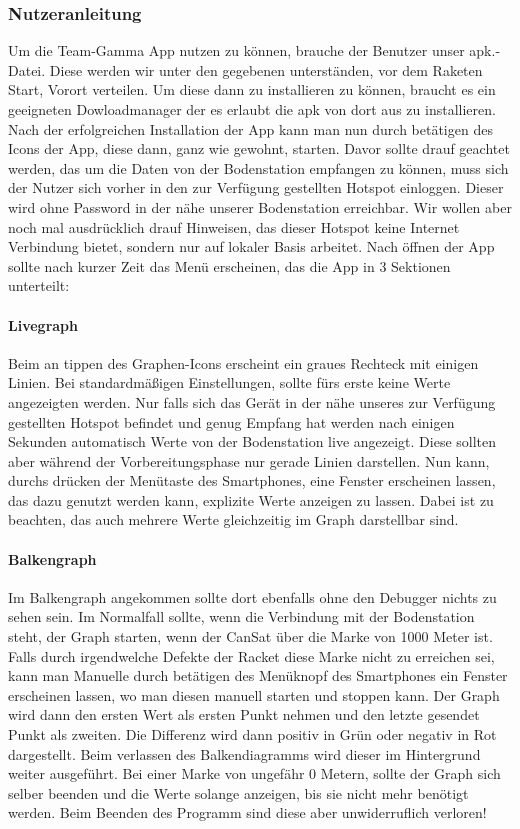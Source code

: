 \subsubsection{Nutzeranleitung}
Um die Team-Gamma App nutzen zu können, brauche der Benutzer unser apk.-Datei. Diese werden wir unter den gegebenen unterständen, vor dem Raketen Start, Vorort verteilen. Um diese dann zu installieren zu können, braucht es ein geeigneten Dowloadmanager der es erlaubt die apk von dort aus zu installieren. Nach der erfolgreichen Installation der App kann man nun durch betätigen des Icons der App, diese dann, ganz wie gewohnt, starten. Davor sollte drauf geachtet werden, das um die Daten von der Bodenstation empfangen zu können, muss sich der Nutzer sich vorher in den zur Verfügung gestellten Hotspot einloggen. Dieser wird ohne Password in der nähe unserer Bodenstation erreichbar. Wir wollen aber noch mal ausdrücklich drauf Hinweisen, das dieser Hotspot keine Internet Verbindung bietet, sondern nur auf lokaler Basis arbeitet.
Nach öffnen der App sollte nach kurzer Zeit das Menü erscheinen, das die App in 3 Sektionen unterteilt: 

	\paragraph{Livegraph}
	Beim an tippen des Graphen-Icons erscheint ein graues Rechteck mit einigen Linien. Bei standardmäßigen Einstellungen, sollte fürs erste keine Werte angezeigten werden. Nur falls sich das Gerät in der nähe unseres zur Verfügung gestellten Hotspot befindet und genug Empfang hat werden nach einigen Sekunden automatisch Werte von der Bodenstation live angezeigt. Diese sollten aber während der Vorbereitungsphase nur gerade Linien darstellen. Nun kann, durchs  drücken der Menütaste des Smartphones, eine Fenster erscheinen lassen, das dazu genutzt werden kann, explizite Werte anzeigen zu lassen. Dabei ist zu beachten, das auch mehrere Werte gleichzeitig im Graph darstellbar sind.
	\paragraph{Balkengraph}
	Im Balkengraph angekommen sollte dort ebenfalls ohne den Debugger nichts zu sehen sein. Im Normalfall sollte, wenn die Verbindung mit der Bodenstation steht, der Graph starten, wenn der CanSat über die Marke von 1000 Meter ist. Falls durch irgendwelche Defekte der Racket diese Marke nicht zu erreichen sei, kann man Manuelle durch betätigen des Menüknopf des Smartphones ein Fenster erscheinen lassen, wo man diesen manuell starten und stoppen kann. Der Graph wird dann den ersten Wert als ersten Punkt nehmen und den letzte gesendet Punkt als zweiten. Die Differenz wird dann positiv in Grün oder negativ in Rot dargestellt. Beim verlassen des Balkendiagramms wird dieser im Hintergrund weiter ausgeführt. Bei einer Marke von ungefähr 0 Metern, sollte der Graph sich selber beenden und die Werte solange anzeigen, bis sie nicht mehr benötigt werden. Beim Beenden des Programm sind diese aber unwiderruflich verloren!
